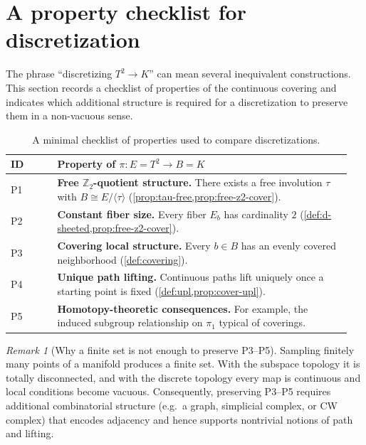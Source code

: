 \documentclass[11pt,a4paper]{article}
\theoremstyle{definition}
\theoremstyle{remark}
\newtheorem{remark}[theorem]{Remark}
\begin{document}
\section{A property checklist for discretization}
\label{sec:property-table}

The phrase ``discretizing \(T^2\to K\)'' can mean several inequivalent constructions. This section records a checklist of properties of the continuous covering and indicates which additional structure is required for a discretization to preserve them in a non-vacuous sense.

\begin{table}[h]
\centering
\begin{tabular}{p{0.13\linewidth} p{0.82\linewidth}}
\hline
\textbf{ID} & \textbf{Property of \(\pi:E=T^2\to B=K\)}\\
\hline
P1 & \textbf{Free \(\mathbb{Z}_2\)-quotient structure.} There exists a free involution \(\tau\) with \(B\cong E/\langle\tau\rangle\) (\cref{prop:tau-free,prop:free-z2-cover}).\\
P2 & \textbf{Constant fiber size.} Every fiber \(E_b\) has cardinality \(2\) (\cref{def:d-sheeted,prop:free-z2-cover}).\\
P3 & \textbf{Covering local structure.} Every \(b\in B\) has an evenly covered neighborhood (\cref{def:covering}).\\
P4 & \textbf{Unique path lifting.} Continuous paths lift uniquely once a starting point is fixed (\cref{def:upl,prop:cover-upl}).\\
P5 & \textbf{Homotopy-theoretic consequences.} For example, the induced subgroup relationship on \(\pi_1\) typical of coverings.\\
\hline
\end{tabular}
\caption{A minimal checklist of properties used to compare discretizations.}
\label{tab:properties}
\end{table}

\begin{remark}[Why a finite set is not enough to preserve P3--P5]
\label{rem:set-not-enough}
Sampling finitely many points of a manifold produces a finite set. With the subspace topology it is totally disconnected, and with the discrete topology every map is continuous and local conditions become vacuous. Consequently, preserving P3--P5 requires additional combinatorial structure (e.g.\ a graph, simplicial complex, or CW complex) that encodes adjacency and hence supports nontrivial notions of path and lifting.
\end{remark}
\end{document}

